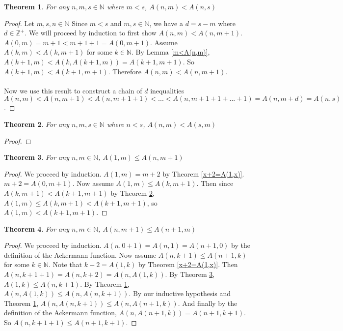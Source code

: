 \documentclass[12pt, letterpaper]{article}
\newtheorem{theorem}{Theorem}
\theoremstyle{case}
\begin{document}
    \begin{theorem}
      \label{a(n,m)<a(n,s)}
      For any $n, m, s \in \mathbb{N}$ where $m < s$, $A(n, m) < A(n, s)$
    \end{theorem}
    \begin{proof}
      Let $m, s, n \in \mathbb{N}$
      Since $m < s$ and $m, s \in \mathbb{N}$, we have a $d = s - m$ where $d \in \mathbb{Z}^+$.
      We will proceed by induction to first show $A(n, m) < A(n, m + 1)$.
      $A(0, m) = m + 1 < m + 1 + 1 = A(0, m + 1)$.
      Assume $A(k, m) < A(k, m + 1)$ for some $k \in \mathbb{N}$.
      By Lemma \ref{m<A(n,m)}, $A(k + 1, m) < A(k, A(k + 1, m)) = A(k + 1, m + 1)$.
      So $A(k + 1, m) < A(k + 1, m + 1)$.
      Therefore $A(n, m) < A(n, m + 1)$.
      \\
      \\
      Now we use this result to construct a chain of $d$ inequalities $A(n, m) < A(n, m + 1) < A(n, m + 1 + 1) < ... < A(n, m + 1 + 1 + ... + 1)
      = A(n, m + d) = A(n, s)$. 
    \end{proof}

    \begin{theorem}
      \label{a(n,m)<a(s,m)}
      For any $n, m, s \in \mathbb{N}$ where $n < s$, $A(n, m) < A(s, m)$
    \end{theorem}
    \begin{proof}
    \end{proof}

    \begin{theorem}
      \label{a(1,m)<=A(n,m+1)}
      For any $n, m \in \mathbb{N}$, $A(1, m) \leq A(n, m + 1)$
    \end{theorem}
    \begin{proof}
      We proceed by induction.
      $A(1, m) = m + 2$ by Theorem \ref{x+2=A(1,x)}.
      $m + 2 = A(0, m + 1)$.
      Now assume $A(1, m) \leq A(k, m + 1)$.
      Then since $A(k, m + 1) < A(k + 1, m + 1)$ by Theorem \ref{a(n,m)<a(s,m)},
      $A(1, m) \leq A(k, m + 1) < A(k + 1, m + 1)$, so
      $A(1, m) < A(k + 1, m + 1)$.
    \end{proof}


    \begin{theorem}
      \label{a(n,m+1)<=a(n+1,m)}
      For any $n, m \in \mathbb{N}$, $A(n, m + 1) \leq A(n + 1, m)$
    \end{theorem}
    \begin{proof}
      We proceed by induction.
      $A(n, 0 + 1) = A(n, 1) = A(n + 1, 0)$ by the definition of the Ackermann function.
      Now assume $A(n, k + 1) \leq A(n + 1, k)$ for some $k \in \mathbb{N}$.
      Note that $k + 2 = A(1, k)$ by Theorem \ref{x+2=A(1,x)}.
      Then $A(n, k + 1 + 1) = A(n, k + 2) = A(n, A(1, k))$.
      By Theorem \ref{a(1,m)<=A(n,m+1)}, $A(1, k) \leq A(n, k + 1)$.
      By Theorem \ref{a(n,m)<a(n,s)}, $A(n, A(1, k)) \leq A(n, A(n, k + 1))$.
      By our inductive hypothesis and Theorem \ref{a(n,m)<a(n,s)},
      $A(n, A(n, k + 1)) \leq A(n, A(n + 1, k))$.
      And finally by the definition of the Ackermann function,
      $A(n, A(n + 1, k)) = A(n + 1, k + 1)$.
      So $A(n, k + 1 + 1) \leq A(n + 1, k + 1)$.
    \end{proof}
\end{document}
